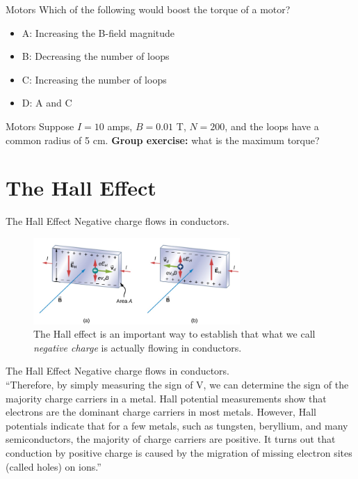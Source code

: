 \documentclass{beamer}
\begin{document}
\begin{frame}{Motors}
Which of the following would boost the torque of a motor?
\begin{itemize}
\item A: Increasing the B-field magnitude
\item B: Decreasing the number of loops
\item C: Increasing the number of loops
\item D: A and C
\end{itemize}
\end{frame}

\begin{frame}{Motors}
Suppose $I = 10$ amps, $B = 0.01$ T, $N = 200$, and the loops have a common radius of 5 cm.  \textbf{Group exercise:} what is the maximum torque?
\end{frame}

\section{The Hall Effect}

\begin{frame}{The Hall Effect}
Negative charge flows in conductors.
\begin{figure}
\centering
\includegraphics[width=0.7\textwidth]{figures/Hall.png}
\caption{\label{fig:Hall} The Hall effect is an important way to establish that what we call \textit{negative charge} is actually flowing in conductors.}
\end{figure}
\end{frame}

\begin{frame}{The Hall Effect}
Negative charge flows in conductors. \\ \vspace{0.5cm}
``Therefore, by simply measuring the sign of V, we can determine the sign of the majority charge carriers in a metal.
Hall potential measurements show that electrons are the dominant charge carriers in most metals. However, Hall potentials
indicate that for a few metals, such as tungsten, beryllium, and many semiconductors, the majority of charge carriers are
positive. It turns out that conduction by positive charge is caused by the migration of missing electron sites (called holes) on
ions.''
\end{frame}
\end{document}
